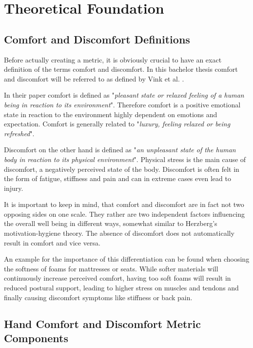 


\chapter{Theoretical Foundation}\label{chapter:theory}

\section{Comfort and Discomfort Definitions}

Before actually creating a metric, it is obviously crucial to have an exact definition of the terms comfort and discomfort. In this bachelor thesis comfort and discomfort will be referred to as defined by Vink et al. \cite{vink2012editorial}.

In their paper comfort is defined as "\textit{pleasant state or relaxed feeling of a human being in reaction to its environment}". Therefore comfort is a positive emotional state in reaction to the environment highly dependent on emotions and expectation. Comfort is generally related to "\textit{luxury, feeling relaxed or being refreshed}".

Discomfort on the other hand is defined as "\textit{an unpleasant state of the human body in reaction to its physical environment}". Physical stress is the main cause of discomfort, a negatively perceived state of the body. Discomfort is often felt in the form of fatigue, stiffness and pain and can in extreme cases even lead to injury.

It is important to keep in mind, that comfort and discomfort are in fact not two opposing sides on one scale. They rather are two independent factors influencing the overall well being in different ways, somewhat similar to Herzberg's motivation-hygiene theory. The absence of discomfort does not automatically result in comfort and vice versa. 

An example for the importance of this differentiation can be found when choosing the softness of foams for mattresses or seats. While softer materials will continuously increase perceived comfort, having too soft foams will result in reduced postural support, leading to higher stress on muscles and tendons and finally causing discomfort symptoms like stiffness or back pain. 

\section{Hand Comfort and Discomfort Metric Components}

